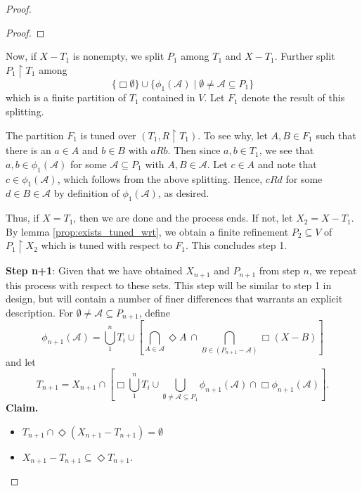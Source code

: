 \documentclass[10pt,a4paper]{amsart}
\begin{document}
\begin{proof}
\begin{proof}
    \end{proof}

    Now, if $X-T_1$ is nonempty, we split $P_1$ among $T_1$ and $X-T_1$. Further split $P_1 \restriction T_1$ among 
    \[
    \{\Box\emptyset\}\cup\{\phi_1(\mathcal{A})\mid \emptyset\neq\mathcal{A} \subseteq P_1\}
    \]
    which is a finite partition of $T_1$ contained in $V$. Let $F_1$ denote the result of this splitting.
    \par
    The partition $F_1$ is tuned over $(T_1, R\restriction T_1)$.
        To see why, let $A,B \in F_1$ such that there is an $a \in A$ and $b \in B$ with $aRb$. Then since $a,b \in T_1$, we see that $a,b \in \phi_1(\mathcal{A})$ for some $\mathcal{A} \subseteq P_1$ with $A,B \in \mathcal{A}$.
        Let $c \in A$ and note that $c \in \phi_1(\mathcal{A})$, which follows from the above splitting.
        Hence, $cRd$ for some $d \in B \in \mathcal{A}$ by definition of $\phi_1(\mathcal{A})$, as desired.

    Thus, if $X=T_1$, then we are done and the process ends. If not, let $X_2=X-T_1$. 
    By lemma \ref{prop:exists_tuned_wrt}, we obtain a finite refinement $P_2\subseteq V$ of $P_1\restriction X_2$ which is tuned with respect to $F_1$.
    This concludes step 1.
    \par
    \textbf{Step n+1}: Given that we have obtained $X_{n+1}$ and $P_{n+1}$ from step $n$, we repeat this process with respect to these sets.
    This step will be similar to step 1 in design, but will contain a number of finer differences that warrants an explicit description.
    For $\emptyset\neq\mathcal{A}\subseteq P_{n+1}$, define
    \[
    \phi_{n+1} (\mathcal{A})= 
    \bigcup_1^n T_i\cup\left[ 
    \bigcap_{A \in \mathcal{A}} \Diamond A \ \cap
    \bigcap_{B \in (P_{n+1}-\mathcal{A})}\Box (X-B)
    \right]
    \]
    and let
    \[
    T_{n+1}=X_{n+1}\cap \left[ \Box\bigcup_1^n T_i \cup \bigcup_{\emptyset \neq\mathcal{A}\subseteq P_1}
    \phi_{n+1}(\mathcal{A}) \cap \Box\phi_{n+1}(\mathcal{A}) \right].
    \]
    \textbf{Claim.} 
    \begin{itemize}
    \item[(i)] $T_{n+1} \cap \Diamond(X_{n+1}-T_{n+1})=\emptyset$
    \item[(ii)] $X_{n+1}-T_{n+1} \subseteq \Diamond T_{n+1}$.
    \end{itemize}
    

\end{proof}
\end{document}
